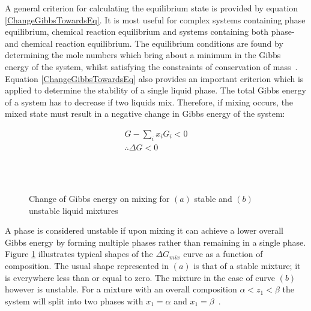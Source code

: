 A general criterion for calculating the equilibrium state is provided by equation \ref{ChangeGibbsTowardsEq}. It is most useful for complex systems containing phase equilibrium, chemical reaction equilibrium and systems containing both phase- and chemical reaction equilibrium. The equilibrium conditions are found by determining the mole numbers which bring about a minimum in the Gibbs energy of the system, whilst satisfying the constraints of conservation of mass~\cite{Dechema, SmithNessAbbott, GasLiquidProperties, SolidLiquidStability, LLECalculation, BilevelOptimization, StabilityAnalysis, ReliableComputationBinaryParams}.\\

Equation \ref{ChangeGibbsTowardsEq} also provides an important criterion which is applied to determine the stability of a single liquid phase. The total Gibbs energy of a system has to decrease if two liquids mix. Therefore, if mixing occurs, the mixed state must result in a negative change in Gibbs energy of the system:\ 

\begin{eqnarray}
G - \sum_{i} x_{i}G_{i} < 0\\
\therefore \Delta G < 0
\end{eqnarray}\

\begin{figure}[t]
\begin{center}
\resizebox{0.7\textwidth}{!}{}\\
\end{center}
\caption{Change of Gibbs energy on mixing for $\left(a\right)$ stable and $\left(b\right)$ unstable liquid mixtures} \label{GibsMixDrawing}
\end{figure}	

A phase is considered unstable if upon mixing it can achieve a lower overall Gibbs energy by forming multiple phases rather than remaining in a single phase. Figure \ref{GibsMixDrawing} illustrates typical shapes of the $\Delta G_{mix}$ curve as a function of composition. The usual shape represented in $\left(a\right)$ is that of a stable mixture; it is everywhere less than or equal to zero. The mixture in the case of curve $\left(b\right)$ however is unstable. For a mixture with an overall composition $\alpha < z_{1}< \beta$ the system will split into two phases with $x_{1} = \alpha$ and  $x_{1} = \beta $~\cite{ SmithNessAbbott, Dechema, SolidLiquidStability, BilevelOptimization, ReliableComputationBinaryParams, MultiphaseEquilibria}.\\

